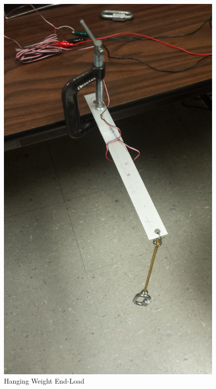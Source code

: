 \documentclass[12pt]{article}
\begin{document}
\begin{figure}[h!] %
   \centering
   \includegraphics[width=5.5in]{hanging_weight.jpg} 
   \caption{Hanging Weight End-Load}
   \label{fig:example}
\end{figure}

\newpage
\end{document}
